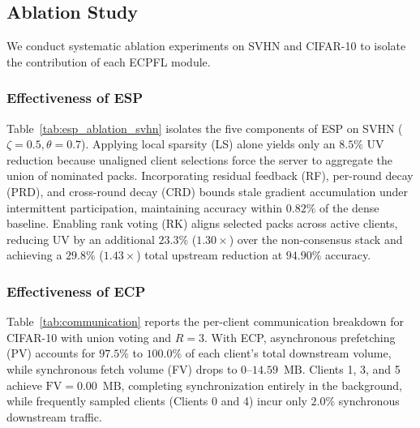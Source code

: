 \subsection{Ablation Study}
\label{sec:ablation}

We conduct systematic ablation experiments on SVHN and CIFAR-10 to isolate the contribution of each \textsc{ECPFL} module.

\subsubsection{Effectiveness of ESP}
Table~\ref{tab:esp_ablation_svhn} isolates the five components of \textsc{ESP} on SVHN ($\zeta=0.5, \theta=0.7$). Applying local sparsity (LS) alone yields only an $8.5\%$ UV reduction because unaligned client selections force the server to aggregate the union of nominated packs. Incorporating residual feedback (RF), per-round decay (PRD), and cross-round decay (CRD) bounds stale gradient accumulation under intermittent participation, maintaining accuracy within $0.82\%$ of the dense baseline. Enabling rank voting (RK) aligns selected packs across active clients, reducing UV by an additional $23.3\%$ ($1.30\times$) over the non-consensus stack and achieving a $29.8\%$ ($1.43\times$) total upstream reduction at $94.90\%$ accuracy.

\subsubsection{Effectiveness of ECP}
Table~\ref{tab:communication} reports the per-client communication breakdown for CIFAR-10 with union voting and $R=3$. 
With ECP, asynchronous prefetching (PV) accounts for $97.5\%$ to $100.0\%$ of each client's total downstream volume, while synchronous fetch volume (FV) drops to $0$--$14.59$~$\mathrm{MB}$.
Clients 1, 3, and 5 achieve $\mathrm{FV}=0.00$~$\mathrm{MB}$, completing synchronization entirely in the background, while frequently sampled clients (Clients 0 and 4) incur only $2.0\%$ synchronous downstream traffic.

